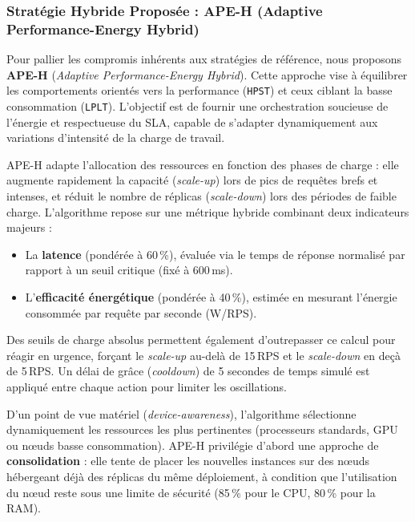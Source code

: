 \subsubsection{Stratégie Hybride Proposée : APE-H (Adaptive Performance-Energy Hybrid)}

Pour pallier les compromis inhérents aux stratégies de référence, nous proposons \textbf{APE-H} (\textit{Adaptive Performance-Energy Hybrid}). Cette approche vise à équilibrer les comportements orientés vers la performance (\texttt{HPST}) et ceux ciblant la basse consommation (\texttt{LPLT}). L'objectif est de fournir une orchestration soucieuse de l'énergie et respectueuse du SLA, capable de s'adapter dynamiquement aux variations d'intensité de la charge de travail.


APE-H adapte l'allocation des ressources en fonction des phases de charge : elle augmente rapidement la capacité (\textit{scale-up}) lors de pics de requêtes brefs et intenses, et réduit le nombre de réplicas (\textit{scale-down}) lors des périodes de faible charge. L'algorithme repose sur une métrique hybride combinant deux indicateurs majeurs :
\begin{itemize}
    \item La \textbf{latence} (pondérée à 60\,\%), évaluée via le temps de réponse normalisé par rapport à un seuil critique (fixé à 600\,ms).
    \item L'\textbf{efficacité énergétique} (pondérée à 40\,\%), estimée en mesurant l'énergie consommée par requête par seconde (W/RPS).
\end{itemize}

Des seuils de charge absolus permettent également d'outrepasser ce calcul pour réagir en urgence, forçant le \textit{scale-up} au-delà de 15\,RPS et le \textit{scale-down} en deçà de 5\,RPS. Un délai de grâce (\textit{cooldown}) de 5 secondes de temps simulé est appliqué entre chaque action pour limiter les oscillations.


D'un point de vue matériel (\textit{device-awareness}), l'algorithme sélectionne dynamiquement les ressources les plus pertinentes (processeurs standards, GPU ou nœuds basse consommation). APE-H privilégie d'abord une approche de \textbf{consolidation} : elle tente de placer les nouvelles instances sur des nœuds hébergeant déjà des réplicas du même déploiement, à condition que l'utilisation du nœud reste sous une limite de sécurité (85\,\% pour le CPU, 80\,\% pour la RAM). 

